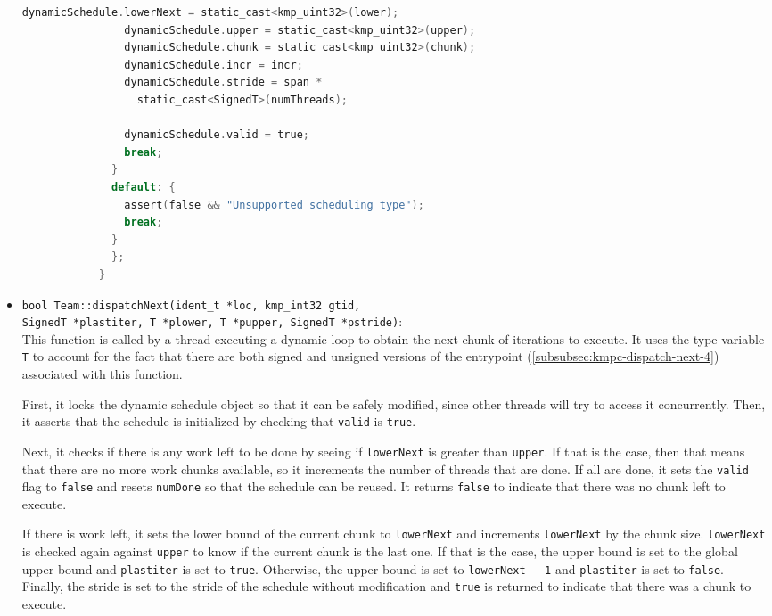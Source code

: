 \begin{itemize}
\begin{lstlisting}[language=C, caption={void Team::dispatchInit},
          label={lst:team-dispatchinit}, escapechar=@]
                dynamicSchedule.lowerNext = static_cast<kmp_uint32>(lower);
                dynamicSchedule.upper = static_cast<kmp_uint32>(upper);
                dynamicSchedule.chunk = static_cast<kmp_uint32>(chunk);
                dynamicSchedule.incr = incr;
                dynamicSchedule.stride = span *
                  static_cast<SignedT>(numThreads);

                dynamicSchedule.valid = true;
                break;
              }
              default: {
                assert(false && "Unsupported scheduling type");
                break;
              }
              };
            }
          \end{lstlisting}

	\item \texttt{bool Team::dispatchNext(ident_t *loc, kmp_int32 gtid,\\SignedT *plastiter, T *plower, T
		      *pupper, SignedT *pstride)}:\\ This function is called by a thread executing a dynamic
	      loop to obtain the next chunk of iterations to execute. It uses the type variable
	      \texttt{T} to account for the fact that there are both signed and unsigned versions of
	      the entrypoint (\cref{subsubsec:kmpc-dispatch-next-4}) associated with this function.

	      First, it locks the dynamic schedule object so that it can be safely modified, since
	      other threads will try to access it concurrently. Then, it asserts that the schedule
	      is initialized by checking that \texttt{valid} is \texttt{true}.

	      Next, it checks if there is any work left to be done by seeing if \texttt{lowerNext}
	      is greater than \texttt{upper}. If that is the case, then that means that there are no
	      more work chunks available, so it increments the number of threads that are done. If
	      all are done, it sets the \texttt{valid} flag to \texttt{false} and resets
	      \texttt{numDone} so that the schedule can be reused. It returns \texttt{false} to
	      indicate that there was no chunk left to execute.

	      If there is work left, it sets the lower bound of the current chunk to \texttt{lowerNext}
	      and increments \texttt{lowerNext} by the chunk size. \texttt{lowerNext} is checked
	      again against \texttt{upper} to know if the current chunk is the last one. If that is
	      the case, the upper bound is set to the global upper bound and \texttt{plastiter} is
	      set to \texttt{true}. Otherwise, the upper bound is set to \texttt{lowerNext - 1} and
	      \texttt{plastiter} is set to \texttt{false}. Finally, the stride is set to the stride
	      of the schedule without modification and \texttt{true} is returned to indicate that
	      there was a chunk to execute.


\end{itemize}
